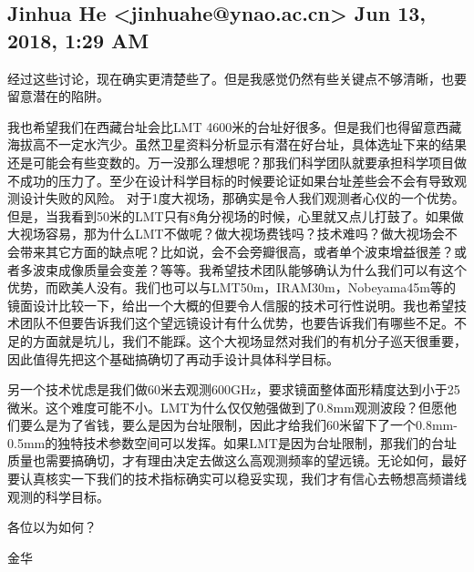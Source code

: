 \documentclass{article}
\newcommand\from[2]{\subsection{{#1} {#2}}}
\newcommand\said[1]{#1}
\begin{document}
\from{
Jinhua He <jinhuahe@ynao.ac.cn>
}{
Jun 13, 2018, 1:29 AM
}
\said{
经过这些讨论，现在确实更清楚些了。但是我感觉仍然有些关键点不够清晰，也要留意潜在的陷阱。

我也希望我们在西藏台址会比LMT 4600米的台址好很多。但是我们也得留意西藏海拔高不一定水汽少。虽然卫星资料分析显示有潜在好台址，具体选址下来的结果还是可能会有些变数的。万一没那么理想呢？那我们科学团队就要承担科学项目做不成功的压力了。至少在设计科学目标的时候要论证如果台址差些会不会有导致观测设计失败的风险。
对于1度大视场，那确实是令人我们观测者心仪的一个优势。但是，当我看到50米的LMT只有8角分视场的时候，心里就又点儿打鼓了。如果做大视场容易，那为什么LMT不做呢？做大视场费钱吗？技术难吗？做大视场会不会带来其它方面的缺点呢？比如说，会不会旁瓣很高，或者单个波束增益很差？或者多波束成像质量会变差？等等。我希望技术团队能够确认为什么我们可以有这个优势，而欧美人没有。我们也可以与LMT50m，IRAM30m，Nobeyama45m等的镜面设计比较一下，给出一个大概的但要令人信服的技术可行性说明。我也希望技术团队不但要告诉我们这个望远镜设计有什么优势，也要告诉我们有哪些不足。不足的方面就是坑儿，我们不能踩。这个大视场显然对我们的有机分子巡天很重要，因此值得先把这个基础搞确切了再动手设计具体科学目标。

另一个技术忧虑是我们做60米去观测600GHz，要求镜面整体面形精度达到小于25微米。这个难度可能不小。LMT为什么仅仅勉强做到了0.8mm观测波段？但愿他们要么是为了省钱，要么是因为台址限制，因此才给我们60米留下了一个0.8mm-0.5mm的独特技术参数空间可以发挥。如果LMT是因为台址限制，那我们的台址质量也需要搞确切，才有理由决定去做这么高观测频率的望远镜。无论如何，最好要认真核实一下我们的技术指标确实可以稳妥实现，我们才有信心去畅想高频谱线观测的科学目标。

各位以为如何？

金华
}
\end{document}
